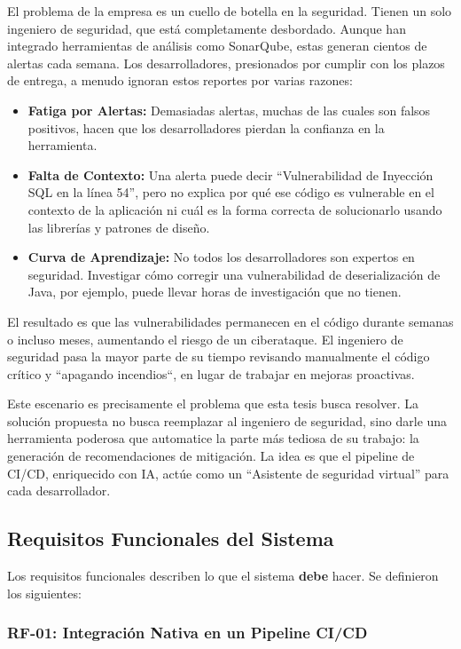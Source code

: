 El problema de la empresa es un cuello de botella en la seguridad. Tienen un solo ingeniero de seguridad, que está completamente desbordado. Aunque han integrado herramientas de análisis como SonarQube, estas generan cientos de alertas cada semana. Los desarrolladores, presionados por cumplir con los plazos de entrega, a menudo ignoran estos reportes por varias razones:
\begin{itemize}
    \item \textbf{Fatiga por Alertas:} Demasiadas alertas, muchas de las cuales son falsos positivos, hacen que los desarrolladores pierdan la confianza en la herramienta.
    \item \textbf{Falta de Contexto:} Una alerta puede decir ``Vulnerabilidad de Inyección SQL en la línea 54'', pero no explica por qué ese código es vulnerable en el contexto de la aplicación ni cuál es la forma correcta de solucionarlo usando las librerías y patrones de diseño.
    \item \textbf{Curva de Aprendizaje:} No todos los desarrolladores son expertos en seguridad. Investigar cómo corregir una vulnerabilidad de deserialización de Java, por ejemplo, puede llevar horas de investigación que no tienen.
\end{itemize}

El resultado es que las vulnerabilidades permanecen en el código durante semanas o incluso meses, aumentando el riesgo de un ciberataque. El ingeniero de seguridad pasa la mayor parte de su tiempo revisando manualmente el código crítico y ``apagando incendios``, en lugar de trabajar en mejoras proactivas.

Este escenario es precisamente el problema que esta tesis busca resolver. La solución propuesta no busca reemplazar al ingeniero de seguridad, sino darle una herramienta poderosa que automatice la parte más tediosa de su trabajo: la generación de recomendaciones de mitigación. La idea es que el pipeline de CI/CD, enriquecido con IA, actúe como un ``Asistente de seguridad virtual'' para cada desarrollador.

\subsection{Requisitos Funcionales del Sistema}

Los requisitos funcionales describen lo que el sistema \textbf{debe} hacer. Se definieron los siguientes:

\subsubsection{RF-01: Integración Nativa en un Pipeline CI/CD}

